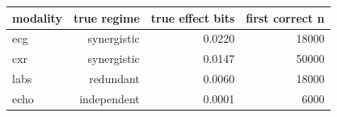 \begin{tabular}{lrrr}
\toprule
\textbf{modality} & \textbf{true regime} & \textbf{true effect bits} & \textbf{first correct n} \\
\midrule
ecg & synergistic & 0.0220 & 18000 \\
cxr & synergistic & 0.0147 & 50000 \\
labs & redundant & 0.0060 & 18000 \\
echo & independent & 0.0001 & 6000 \\
\bottomrule
\end{tabular}
